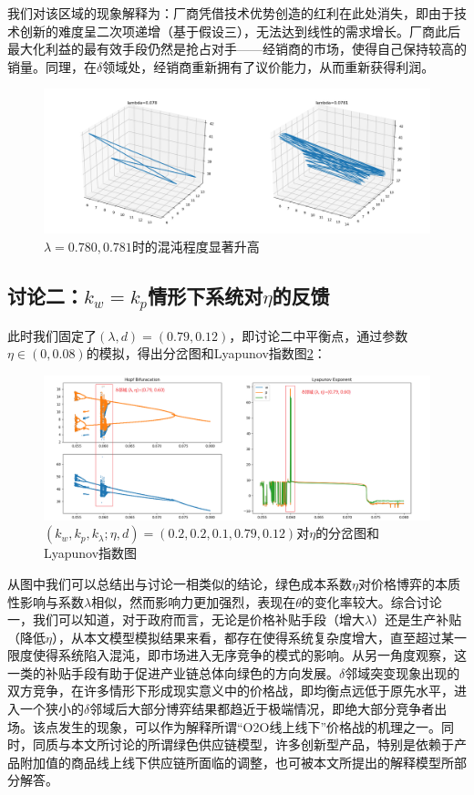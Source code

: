 \documentclass{article}
\begin{document}
\par 我们对该区域的现象解释为：厂商凭借技术优势创造的红利在此处消失，即由于技术创新的难度呈二次项递增（基于假设三），无法达到线性的需求增长。厂商此后最大化利益的最有效手段仍然是抢占对手——经销商的市场，使得自己保持较高的销量。同理，在$\delta$领域处，经销商重新拥有了议价能力，从而重新获得利润。
\begin{figure}[htp]
    \centering
    \includegraphics[width=16.5cm]{attractor.png}
    \caption{$\lambda=0.780, 0.781$时的混沌程度显著升高}
    \label{attractor}
\end{figure}
\subsection{讨论二：$k_w=k_p$情形下系统对$\eta$的反馈}
\par 此时我们固定了$(\lambda,d)=(0.79,0.12)$，即讨论二中平衡点，通过参数$\eta\in(0,0.08)$的模拟，得出分岔图和Lyapunov指数图\ref{Hopf_Lyapunov_2_1}：
\begin{figure}[htp]
    \centering
    \includegraphics[width=16.5cm]{Hopf_Lyapunov_2_1.png}
    \caption{$(k_w,k_p,k_\lambda;\eta,d)=(0.2,0.2,0.1,0.79,0.12)$对$\eta$的分岔图和Lyapunov指数图}
    \label{Hopf_Lyapunov_2_1}
\end{figure}
\par 从图中我们可以总结出与讨论一相类似的结论，绿色成本系数$\eta$对价格博弈的本质性影响与系数$\lambda$相似，然而影响力更加强烈，表现在$\theta$的变化率较大。综合讨论一，我们可以知道，对于政府而言，无论是价格补贴手段（增大$\lambda$）还是生产补贴（降低$\eta$），从本文模型模拟结果来看，都存在使得系统复杂度增大，直至超过某一限度使得系统陷入混沌，即市场进入无序竞争的模式的影响。从另一角度观察，这一类的补贴手段有助于促进产业链总体向绿色的方向发展。$\delta$邻域突变现象出现的双方竞争，在许多情形下形成现实意义中的价格战，即均衡点远低于原先水平，进入一个狭小的$\delta$邻域后大部分博弈结果都趋近于极端情况，即绝大部分竞争者出场。该点发生的现象，可以作为解释所谓“O2O线上线下”价格战的机理之一。同时，同质与本文所讨论的所谓绿色供应链模型，许多创新型产品，特别是依赖于产品附加值的商品线上线下供应链所面临的调整，也可被本文所提出的解释模型所部分解答。
\end{document}
